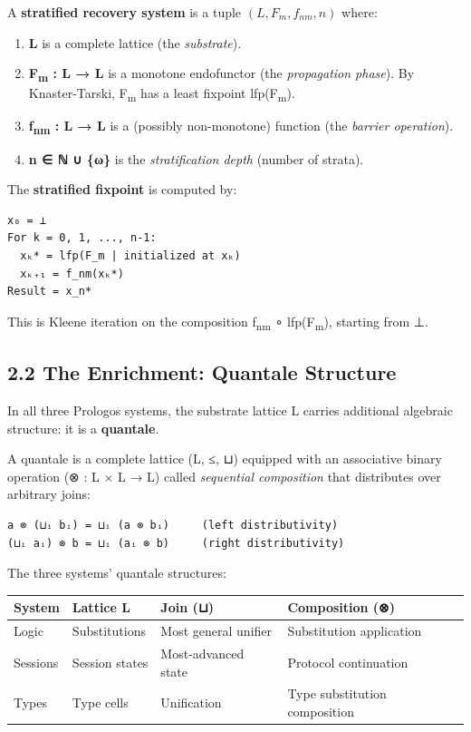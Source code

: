 \documentclass[11pt]{article}
\begin{document}
A \textbf{stratified recovery system} is a tuple \((L, F_m, f_{nm}, n)\) where:

\begin{enumerate}
\item \textbf{L} is a complete lattice (the \emph{substrate}).
\item \textbf{F\textsubscript{m} : L → L} is a monotone endofunctor (the \emph{propagation phase}).
By Knaster-Tarski, F\textsubscript{m} has a least fixpoint lfp(F\textsubscript{m}).
\item \textbf{f\textsubscript{nm} : L → L} is a (possibly non-monotone) function (the \emph{barrier
operation}).
\item \textbf{n ∈ ℕ ∪ \{ω\}} is the \emph{stratification depth} (number of strata).
\end{enumerate}

The \textbf{stratified fixpoint} is computed by:

\begin{verbatim}
x₀ = ⊥
For k = 0, 1, ..., n-1:
  xₖ* = lfp(F_m | initialized at xₖ)
  xₖ₊₁ = f_nm(xₖ*)
Result = x_n*
\end{verbatim}

This is Kleene iteration on the composition f\textsubscript{nm} ∘ lfp(F\textsubscript{m}), starting from ⊥.
\subsection{2.2 The Enrichment: Quantale Structure}
\label{sec:orgeb940ec}

In all three Prologos systems, the substrate lattice L carries additional
algebraic structure: it is a \textbf{quantale}.

A quantale is a complete lattice (L, ≤, ⊔) equipped with an associative binary
operation (⊗ : L × L → L) called \emph{sequential composition} that distributes over
arbitrary joins:

\begin{verbatim}
a ⊗ (⊔ᵢ bᵢ) = ⊔ᵢ (a ⊗ bᵢ)     (left distributivity)
(⊔ᵢ aᵢ) ⊗ b = ⊔ᵢ (aᵢ ⊗ b)     (right distributivity)
\end{verbatim}

The three systems' quantale structures:

\begin{center}
\begin{tabular}{llll}
System & Lattice L & Join (⊔) & Composition (⊗)\\
\hline
Logic & Substitutions & Most general unifier & Substitution application\\
Sessions & Session states & Most-advanced state & Protocol continuation\\
Types & Type cells & Unification & Type substitution composition\\
\end{tabular}
\end{center}
\end{document}
